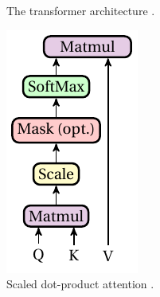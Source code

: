\begin{figure}[!h]
\begin{minipage}{0.6\columnwidth}
        \caption{The transformer architecture \citep{vaswani2017attention}.}
        \label{fig:transformer}
    \end{minipage}
    \hspace{3em}
    \begin{minipage}{0.3\columnwidth}
        \centering
        \includegraphics[width=0.6\columnwidth]{chapter2/pictures/scaled_dot_product_attention.pdf}
        \caption{Scaled dot-product attention \citep{vaswani2017attention}.}
        \label{fig:scaled_dot_product_attention}

\end{minipage}
\end{figure}
